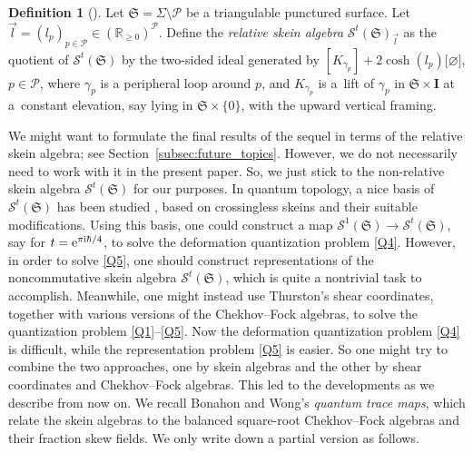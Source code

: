 \documentclass[pdftex]{sigma}
\numberwithin{equation}{section}
\theoremstyle{definition}
\newtheorem{Definition}[Theorem]{Definition}
\begin{document}
\begin{Definition}[\cite{AS, FKL}]
\label{def:relative_skein_algebra}
Let $\mathfrak{S} = \Sigma \setminus \mathcal{P}$ be a triangulable punctured surface. Let $\vec{l} = (l_p)_{p \in \mathcal{P}} \in (\mathbb{R}_{\ge 0})^\mathcal{P}$.
Define the {\em relative skein algebra} $\mathcal{S}^t(\mathfrak{S})_{\vec{l}}$ as the quotient of $\mathcal{S}^t(\mathfrak{S})$ by the two-sided ideal generated by $[K_{\gamma_p}] + 2\cosh(l_p) [{\varnothing]}$, $p\in \mathcal{P}$, where $\gamma_p$ is a peripheral loop around $p$, and $K_{\gamma_p}$ is a~lift of $\gamma_p$ in $\mathfrak{S} \times \mathbf{I}$ at a~constant elevation, say lying in $\mathfrak{S} \times \{0\}$, with the upward vertical framing.
\end{Definition}
We might want to formulate the final results of the sequel \cite{sequel} in terms of the relative skein algebra; see Section~\ref{subsec:future_topics}. However, we do not necessarily need to work with it in the present paper. So, we just stick to the non-relative skein algebra $\mathcal{S}^t(\mathfrak{S})$ for our purposes.
In quantum topology, a nice basis of $\mathcal{S}^t(\mathfrak{S})$ has been studied \cite{AK, DThurston}, based on crossingless skeins and their suitable modifications. Using this basis, one could construct a map $\mathcal{S}^1(\mathfrak{S}) \to \mathcal{S}^t(\mathfrak{S})$, say for $t = {\rm e}^{\pi {\rm i} \hbar/4}$, to solve the deformation quantization problem \ref{Q4}. However, in order to solve \ref{Q5}, one should construct representations of the noncommutative skein algebra $\mathcal{S}^t(\mathfrak{S})$, which is quite a nontrivial task to accomplish. Meanwhile, one might instead use Thurston's shear coordinates, together with various versions of the Chekhov--Fock algebras, to solve the quantization problem \ref{Q1}--\ref{Q5}. Now the deformation quantization problem \ref{Q4} is difficult, while the representation problem \ref{Q5} is easier. So one might try to combine the two approaches, one by skein algebras and the other by shear coordinates and Chekhov--Fock algebras. This led to the developments as we describe from now on.
We recall Bonahon and Wong's {\em quantum trace maps}, which relate the skein algebras to the balanced square-root Chekhov--Fock algebras and their fraction skew fields. We only write down a partial version as follows.
\end{document}
